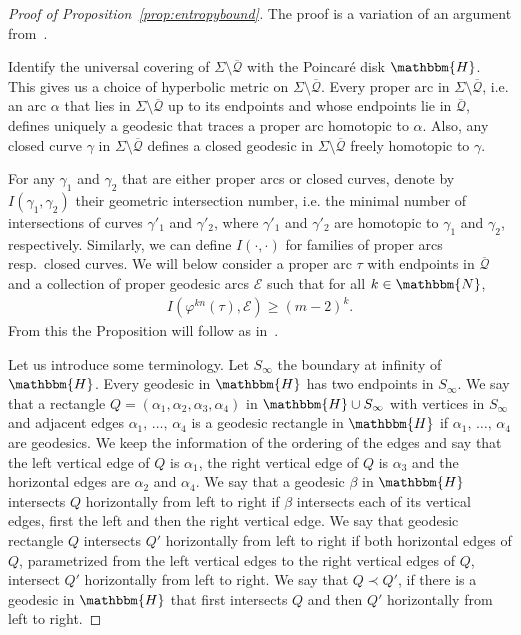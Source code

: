 \documentclass[10pt,a4paper]{amsart}
\numberwithin{equation}{section}
\newcommand{\N}{\mathbbm{N}}
\newcommand{\Hy}{\mathbbm{H}}
\newcommand{\clQ}{\mathcal{Q}}
\newcommand{\clE}{\mathcal{E}}
\theoremstyle{definition}
\theoremstyle{remark}
\begin{document}
\begin{proof}[Proof of Proposition~\ref{prop:entropybound}]
The proof is a variation of an argument from~\cite{FranksHandel1988}.

Identify the universal covering of $\Sigma \setminus \overline{\clQ}$ with the Poincaré disk $\Hy$. This gives us a choice of hyperbolic metric on $\Sigma \setminus \overline{\clQ}$. Every proper arc in $\Sigma \setminus \overline{\clQ}$, i.e. an arc $\alpha$ that lies in $\Sigma\setminus \overline{\clQ}$ up to its endpoints and whose endpoints lie in $\overline{\clQ}$, defines uniquely a geodesic that traces a proper arc homotopic to $\alpha$. Also, any closed curve $\gamma$ in $\Sigma\setminus \overline{\clQ}$ defines a closed geodesic in $\Sigma \setminus \overline{\clQ}$ freely homotopic to $\gamma$.

For any $\gamma_1$ and $\gamma_2$ that are either proper arcs or closed curves, denote by $I(\gamma_1, \gamma_2)$ their geometric intersection number, i.e. the minimal number of intersections of curves $\gamma'_1$ and $\gamma'_2$, where $\gamma'_1$ and $\gamma'_2$ are homotopic to $\gamma_1$ and $\gamma_2$, respectively. Similarly, we can define $I(\cdot, \cdot)$ for families of proper arcs resp.\ closed curves. We will below consider a proper arc $\tau$ with endpoints in $\overline{\clQ}$ and a collection of proper geodesic arcs $\clE$ such that for all $k\in \N$,
\begin{align}\label{intersection}
I(\varphi^{kn}(\tau), \clE) \geq (m-2)^k.
\end{align}
From this the Proposition will follow as in~\cite{FranksHandel1988}.



Let us introduce some terminology. Let $S_{\infty}$ the boundary at infinity of $\Hy$. Every geodesic in $\Hy$ has two endpoints in $S_{\infty}$. We say that a rectangle $Q=(\alpha_1, \alpha_2, \alpha_3, \alpha_4)$ in $\Hy \cup S_{\infty}$ with vertices in $S_{\infty}$ and adjacent edges $\alpha_1, \,\ldots,\, \alpha_4$ is a geodesic rectangle in $\Hy$ if $\alpha_1,\, \ldots, \,\alpha_4$ are geodesics. We keep the information of the ordering of the edges and say that the left vertical edge of $Q$ is $\alpha_1$, the right vertical edge of $Q$ is $\alpha_3$ and the horizontal edges are $\alpha_2$ and $\alpha_4$. We say that a geodesic $\beta$ in $\Hy$ intersects $Q$ horizontally from left to right if $\beta$ intersects each of its vertical edges, first the left and then the right vertical edge. We say that geodesic rectangle $Q$ intersects $Q'$ horizontally from left to right if both horizontal edges of $Q$, parametrized from the left vertical edges to the right vertical edges of $Q$, intersect $Q'$ horizontally from left to right. We say that $Q\prec Q'$, if there is a geodesic in $\Hy$ that first intersects $Q$ and then $Q'$ horizontally from left to right.


\end{proof}
\end{document}
